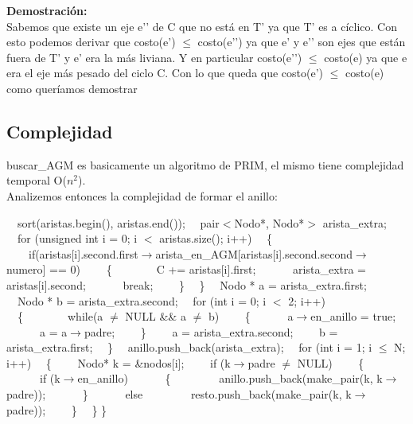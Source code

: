 \begin{itemize}
	
	\textbf{Demostración:} \\
	Sabemos que existe un eje e’’ de C que no está en T’ ya que T’ es a cíclico. Con esto podemos derivar que costo(e’) $\leq$ costo(e’’) ya que e’ y e’’ son ejes que están fuera de T’ y e’ era la más liviana. Y en particular costo(e’’) $\leq$ costo(e) ya que e era el eje más pesado del ciclo C. Con lo que queda que costo(e’) $\leq$ costo(e) como queríamos demostrar

\end{itemize}


\newpage
\subsection{Complejidad}


buscar\_AGM es basicamente un algoritmo de PRIM, el mismo tiene complejidad temporal O($n^2$).
\\
Analizemos entonces la complejidad de formar el anillo:

\begin{codebox}
\li \ \ sort(aristas.begin(), aristas.end());   
\li \ \ pair$<$Nodo*, Nodo*$>$ arista\_extra; 
\li \ \ for (unsigned int i = 0; i $<$ aristas.size(); i++) 
\li \ \ \{
\li \ \ \ \ if(aristas[i].second.first$\rightarrow$arista\_en\_AGM[aristas[i].second.second$\rightarrow$numero] == 0) 
\li \ \ \ \ \{\ \ 
\li \ \ \ \ \ \ C += aristas[i].first;  
\li \ \ \ \ \ \ arista\_extra = aristas[i].second;  
\li \ \ \ \ \ \ break;
\li \ \ \ \ \}
\li \ \ \}
\li \ \ Nodo * a = arista\_extra.first; 
\li \ \ Nodo * b = arista\_extra.second;  
\li \ \ for (int i = 0; i $<$ 2; i++) \RComment{O(1)}
\li \ \ \{\ \ \ \ 
\li \ \ \ \ while(a $\neq$ NULL \&\& a $\neq$ b)    
\li \ \ \ \ \{
\li \ \ \ \ \ \ a$\rightarrow$en\_anillo = true;  
\li \ \ \ \ \ \ a = a$\rightarrow$padre;          
\li \ \ \ \ \}
\li \ \ \ \ a = arista\_extra.second;             
\li \ \ \ \ b = arista\_extra.first;              
\li \ \ \}
\li \ \ anillo.push\_back(arista\_extra);       
\li \ \ for (int i = 1; i $\leq$ N; i++)      
\li \ \ \{
\li \ \ \ \ Nodo* k = &nodos[i];          
\li \ \ \ \ if (k$\rightarrow$padre $\neq$ NULL)      
\li \ \ \ \ \{
\li \ \ \ \ \ \ if (k$\rightarrow$en\_anillo)   
\li \ \ \ \ \ \ \{
\li \ \ \ \ \ \ \ \ anillo.push\_back(make\_pair(k, k$\rightarrow$padre));    \RComment{O(1)}
\li \ \ \ \ \ \ \}
\li \ \ \ \ \ \ else
\li \ \ \ \ \ \ \ \ resto.push\_back(make\_pair(k, k$\rightarrow$padre));     
\li \ \ \ \ \}
\li \ \ \}
\li \}
\end{codebox}

